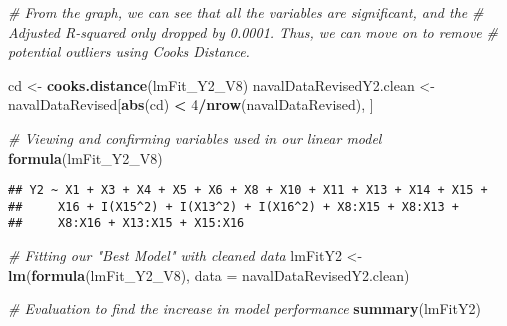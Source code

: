 \documentclass[
]{article}
\newenvironment{Shaded}{\begin{snugshade}}{\end{snugshade}}
\newcommand{\CommentTok}[1]{\textcolor[rgb]{0.56,0.35,0.01}{\textit{#1}}}
\newcommand{\DataTypeTok}[1]{\textcolor[rgb]{0.13,0.29,0.53}{#1}}
\newcommand{\DecValTok}[1]{\textcolor[rgb]{0.00,0.00,0.81}{#1}}
\newcommand{\KeywordTok}[1]{\textcolor[rgb]{0.13,0.29,0.53}{\textbf{#1}}}
\newcommand{\NormalTok}[1]{#1}
\newcommand{\OperatorTok}[1]{\textcolor[rgb]{0.81,0.36,0.00}{\textbf{#1}}}
\newcommand{\StringTok}[1]{\textcolor[rgb]{0.31,0.60,0.02}{#1}}
\begin{document}
\begin{Shaded}
\begin{Highlighting}[]
\CommentTok{# From the graph, we can see that all the variables are significant, and the }
\CommentTok{# Adjusted R-squared only dropped by 0.0001. Thus, we can move on to remove }
\CommentTok{# potential outliers using Cooks Distance.}

\NormalTok{cd <-}\StringTok{ }\KeywordTok{cooks.distance}\NormalTok{(lmFit_Y2_V8)}
\NormalTok{navalDataRevisedY2.clean <-}\StringTok{ }\NormalTok{navalDataRevised[}\KeywordTok{abs}\NormalTok{(cd) }\OperatorTok{<}\StringTok{ }\DecValTok{4}\OperatorTok{/}\KeywordTok{nrow}\NormalTok{(navalDataRevised), ]}

\CommentTok{# Viewing and confirming variables used in our linear model}
\KeywordTok{formula}\NormalTok{(lmFit_Y2_V8)}
\end{Highlighting}
\end{Shaded}

\begin{verbatim}
## Y2 ~ X1 + X3 + X4 + X5 + X6 + X8 + X10 + X11 + X13 + X14 + X15 + 
##     X16 + I(X15^2) + I(X13^2) + I(X16^2) + X8:X15 + X8:X13 + 
##     X8:X16 + X13:X15 + X15:X16
\end{verbatim}

\begin{Shaded}
\begin{Highlighting}[]
\CommentTok{# Fitting our "Best Model" with cleaned data}
\NormalTok{lmFitY2 <-}\StringTok{ }\KeywordTok{lm}\NormalTok{(}\KeywordTok{formula}\NormalTok{(lmFit_Y2_V8), }\DataTypeTok{data =}\NormalTok{ navalDataRevisedY2.clean)}

\CommentTok{# Evaluation to find the increase in model performance}
\KeywordTok{summary}\NormalTok{(lmFitY2)}
\end{Highlighting}
\end{Shaded}
\end{document}
